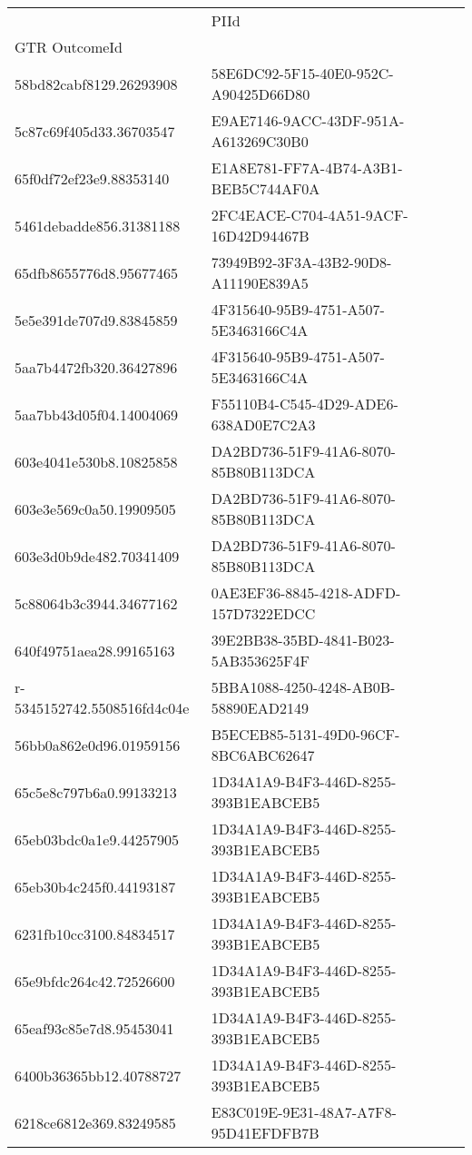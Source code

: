 \begin{tabular}{ll}
\toprule
 & PIId \\
GTR OutcomeId &  \\
\midrule
58bd82cabf8129.26293908 & 58E6DC92-5F15-40E0-952C-A90425D66D80 \\
5c87c69f405d33.36703547 & E9AE7146-9ACC-43DF-951A-A613269C30B0 \\
65f0df72ef23e9.88353140 & E1A8E781-FF7A-4B74-A3B1-BEB5C744AF0A \\
5461debadde856.31381188 & 2FC4EACE-C704-4A51-9ACF-16D42D94467B \\
65dfb8655776d8.95677465 & 73949B92-3F3A-43B2-90D8-A11190E839A5 \\
5e5e391de707d9.83845859 & 4F315640-95B9-4751-A507-5E3463166C4A \\
5aa7b4472fb320.36427896 & 4F315640-95B9-4751-A507-5E3463166C4A \\
5aa7bb43d05f04.14004069 & F55110B4-C545-4D29-ADE6-638AD0E7C2A3 \\
603e4041e530b8.10825858 & DA2BD736-51F9-41A6-8070-85B80B113DCA \\
603e3e569c0a50.19909505 & DA2BD736-51F9-41A6-8070-85B80B113DCA \\
603e3d0b9de482.70341409 & DA2BD736-51F9-41A6-8070-85B80B113DCA \\
5c88064b3c3944.34677162 & 0AE3EF36-8845-4218-ADFD-157D7322EDCC \\
640f49751aea28.99165163 & 39E2BB38-35BD-4841-B023-5AB353625F4F \\
r-5345152742.5508516fd4c04e & 5BBA1088-4250-4248-AB0B-58890EAD2149 \\
56bb0a862e0d96.01959156 & B5ECEB85-5131-49D0-96CF-8BC6ABC62647 \\
65c5e8c797b6a0.99133213 & 1D34A1A9-B4F3-446D-8255-393B1EABCEB5 \\
65eb03bdc0a1e9.44257905 & 1D34A1A9-B4F3-446D-8255-393B1EABCEB5 \\
65eb30b4c245f0.44193187 & 1D34A1A9-B4F3-446D-8255-393B1EABCEB5 \\
6231fb10cc3100.84834517 & 1D34A1A9-B4F3-446D-8255-393B1EABCEB5 \\
65e9bfdc264c42.72526600 & 1D34A1A9-B4F3-446D-8255-393B1EABCEB5 \\
65eaf93c85e7d8.95453041 & 1D34A1A9-B4F3-446D-8255-393B1EABCEB5 \\
6400b36365bb12.40788727 & 1D34A1A9-B4F3-446D-8255-393B1EABCEB5 \\
6218ce6812e369.83249585 & E83C019E-9E31-48A7-A7F8-95D41EFDFB7B \\

\end{tabular}
